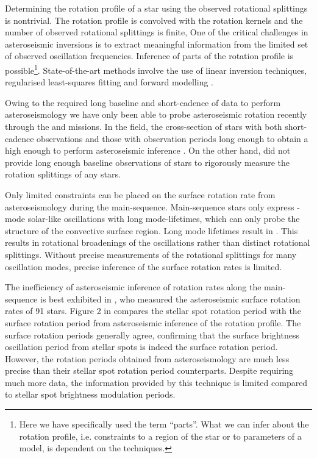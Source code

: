 Determining the rotation profile of a star using the observed rotational splittings is nontrivial. The rotation profile is convolved with the rotation kernels and the number of observed rotational splittings is finite,
One of the critical challenges in asteroseismic inversions is to extract meaningful information from the limited set of observed oscillation frequencies. Inference of parts of the rotation profile is possible\footnote{Here we have specifically used the term “parts”. What we can infer about the rotation profile, i.e. constraints to a region of the star or to parameters of a model, is dependent on the techniques.}.
State-of-the-art methods involve the use of linear inversion techniques, regularised least-squares fitting and forward modelling \citep[see, e.g.,][ for thorough discussion of these techniques]{christensen-dalsgaard_comparison_1990, christensen-dalsgaard_generalized_1993,aerts_asteroseismology_2010}.

Owing to the required long baseline and short-cadence of data to perform asteroseismology we have only been able to probe asteroseismic rotation recently through the \kepler{} and \ktoo{} missions.
In the \kepler{} field, the cross-section of stars with both short-cadence observations and those with observation periods long enough to obtain a high enough  to perform asteroseismic inference .
On the other hand, \ktoo{} did not provide long enough baseline observations of stars to rigorously measure the rotation splittings of any stars.

Only limited constraints can be placed on the surface rotation rate from asteroseismology during the main-sequence.
Main-sequence stars only express -mode solar-like oscillations with long mode-lifetimes, which can only probe the structure of the convective surface region.
Long mode lifetimes result in .
This results in rotational broadenings of the oscillations rather than distinct rotational splittings.
Without precise measurements of the rotational splittings for many oscillation modes, precise inference of the surface rotation rates is limited.

The inefficiency of asteroseismic inference of rotation rates along the main-sequence is best exhibited in \citet{hall_weakened_2021}, who measured the asteroseismic surface rotation rates of 91 stars.
Figure 2 in \citet{hall_weakened_2021} compares the stellar spot rotation period with the surface rotation period from asteroseismic inference of the rotation profile.
The surface rotation periods generally agree, confirming that the surface brightness oscillation period from stellar spots is indeed the surface rotation period.
However, the rotation periods obtained from asteroseismology are much less precise than their stellar spot rotation period counterparts.
Despite requiring much more data, the information provided by this technique is limited compared to stellar spot brightness modulation periods.

